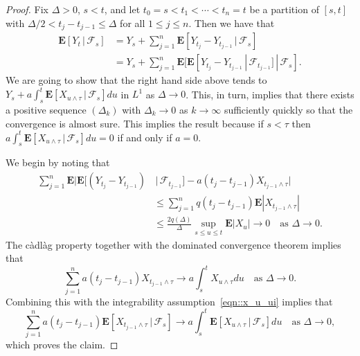 \documentclass[10pt]{amsart}
\let\mathcal\mathscr
\theoremstyle{plain}
\numberwithin{theorem}{section}
\theoremstyle{definition}
\newcommand{\CF}{{\mathcal F}}
\newcommand \E {{\mathbf E}}
\newcommand{\cadlag}{càdlàg}
\newcommand{\giv}{\,|\,}
\begin{document}
\begin{proof}
Fix $\Delta > 0$, $s < t$, and let $t_0 = s < t_1 < \cdots < t_n = t$ be a partition of $[s,t]$ with $\Delta/2 < t_j-t_{j-1} \leq \Delta$ for all $1 \leq j \leq n$. Then we have that\vspace*{-4pt}
\begin{align*}
\E[ Y_t \giv \CF_s ]
&= Y_s + \sum_{j=1}^n \E[ Y_{t_j} - Y_{t_{j-1}} \giv \CF_s]\\[-3pt]
&= Y_s + \sum_{j=1}^n \E[ \E[ Y_{t_j} - Y_{t_{j-1}} \giv \CF_{t_{j-1}}] \giv \CF_s].
\end{align*}
We are going to show that the right hand side above tends to $Y_s + a \int_s^t \E[ X_{u \wedge \tau} \giv \CF_s] du$ in $L^1$ as $\Delta \to 0$. This, in turn, implies that there exists a positive sequence $(\Delta_k)$ with $\Delta_k \to 0$ as $k \to \infty$ sufficiently quickly so that the convergence is almost sure. This implies the result because if $s < \tau$ then $a \int_s^t \E[ X_{u \wedge \tau} \giv \CF_s] du =0$ if and only if $a =0$.

We begin by noting that
\begin{align*}
\sum_{j=1}^n \E\bigl| \E[ (Y_{t_j} - Y_{t_{j-1}}) &\giv \CF_{t_{j-1}}] - a(t_j-t_{j-1}) X_{t_{j-1} \wedge \tau} \bigr|\\[
-10pt]
&\leq \sum_{j=1}^n q(t_j-t_{j-1}) \E|X_{t_{j-1} \wedge \tau}|\\
&\leq \frac{2q(\Delta)}{\Delta} \sup_{s \leq u \leq t} \E|X_u| \to 0 \quad\text{as $\textstyle \Delta \to 0$}.
\end{align*}
The {\cadlag} property together with the dominated convergence theorem implies that
\begin{equation*}
\sum_{j=1}^n a(t_j-t_{j-1}) X_{t_{j-1} \wedge \tau} \to a \int_s^t X_{u \wedge \tau} du \quad\text{as $\textstyle \Delta \to 0$}.
\end{equation*}
Combining this with the integrability assumption~\eqref{eqn::x_u_ui} implies that
\begin{equation*}
\sum_{j=1}^n a(t_j-t_{j-1}) \E[ X_{t_{j-1} \wedge \tau} \giv \CF_s] \to a \int_s^t \E[ X_{u \wedge \tau} \giv \CF_s] du \quad\text{as $\textstyle \Delta \to 0$},
\end{equation*}
which proves the claim.
\end{proof}
\end{document}
